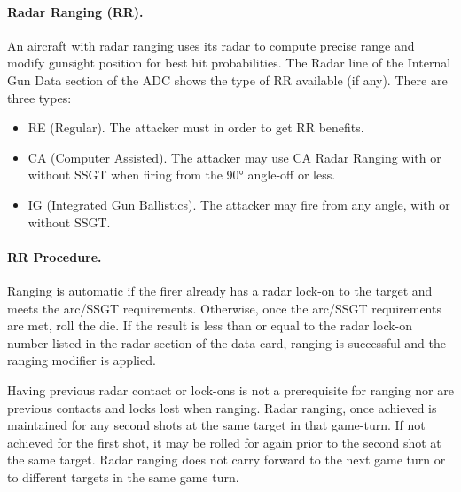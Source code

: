 

\paragraph{Radar Ranging (RR).} An aircraft with radar ranging uses its radar to compute precise range and modify gunsight position for best hit probabilities. The Radar line of the Internal Gun Data section of the ADC shows the type of RR available (if any). There are three types:

\begin{itemize}

\item RE (Regular). The attacker must  in order to get RR benefits.

\item CA (Computer Assisted). The attacker may use CA Radar Ranging with or without SSGT when firing from the 90° angle-off or less.

\item IG (Integrated Gun Ballistics). The attacker may fire from any angle, with or without SSGT.

\end{itemize}

\paragraph{RR Procedure.} Ranging is automatic if the firer already has a radar lock-on to the target and meets the arc/SSGT requirements. Otherwise, once the arc/SSGT requirements are met, roll the die. If the result is less than or equal to the radar lock-on number listed in the radar section of the data card, ranging is successful and the ranging modifier is applied.

Having previous radar contact or lock-ons is not a prerequisite for ranging nor are previous contacts and locks lost when ranging. Radar ranging, once achieved is maintained for any second shots at the same target in that game-turn. If not achieved for the first shot, it may be rolled for again prior to the second shot at the same target. Radar ranging does not carry forward to the next game turn or to different targets in the same game turn.


